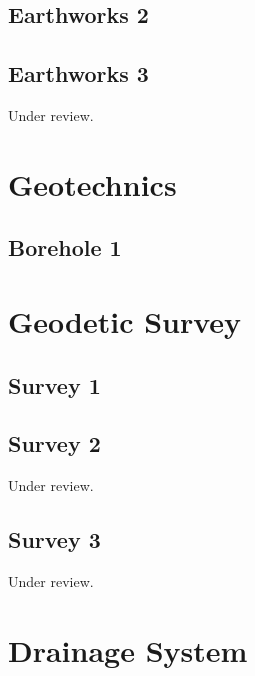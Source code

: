 \documentclass{scrartcl}
\begin{document}
\subsection{Earthworks 2}
\label{sec:earth_2}
\clearpage

\subsection{Earthworks 3}
\label{sec:earth_3}
Under review.%
\clearpage

\section{Geotechnics}

\subsection{Borehole 1}
\label{sec:borehole_1}
\clearpage

\section{Geodetic Survey}

\subsection{Survey 1}
\label{sec:survey_1}
\clearpage

\subsection{Survey 2} %
\label{sec:survey_2}
Under review.%
\clearpage

\subsection{Survey 3} %
\label{sec:survey_3}
Under review.%
\clearpage


\section{Drainage System}
\end{document}
